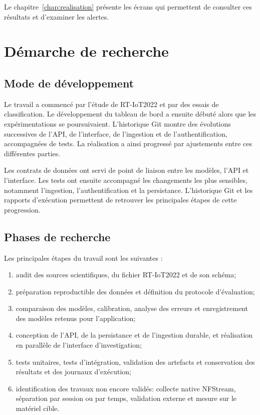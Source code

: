 Le chapitre~\ref{chap:realisation} présente les écrans qui permettent de
consulter ces résultats et d'examiner les alertes.

\section{D\'emarche de recherche}

\subsection{Mode de d\'eveloppement}

Le travail a commencé par l'étude de RT-IoT2022 et par des essais de
classification. Le développement du tableau de bord a ensuite débuté alors
que les expérimentations se poursuivaient. L'historique Git montre des
évolutions successives de l'API, de l'interface, de l'ingestion et de
l'authentification, accompagnées de tests. La réalisation a ainsi progressé
par ajustements entre ces différentes parties.

Les contrats de donn\'ees ont servi de point de liaison entre les mod\`eles,
l'API et l'interface. Les tests ont ensuite accompagn\'e les changements les
plus sensibles, notamment l'ingestion, l'authentification et la persistance.
L'historique Git et les rapports d'ex\'ecution permettent de retrouver les
principales \'etapes de cette progression.

\subsection{Phases de recherche}

Les principales étapes du travail sont les suivantes :

\begin{enumerate}
  \item audit des sources scientifiques, du fichier RT-IoT2022 et de son sch\'ema;
  \item pr\'eparation reproductible des donn\'ees et d\'efinition du protocole
        d'\'evaluation;
  \item comparaison des modèles, calibration, analyse des erreurs et
        enregistrement des modèles retenus pour l'application;
  \item conception de l'API, de la persistance et de l'ingestion durable,
        et r\'ealisation en parall\`ele de l'interface d'investigation;
  \item tests unitaires, tests d'int\'egration, validation des artefacts et
        conservation des résultats et des journaux d'exécution;
  \item identification des travaux non encore valid\'es: collecte native
        NFStream, s\'eparation par session ou par temps, validation externe et
        mesure sur le mat\'eriel cible.
\end{enumerate}

